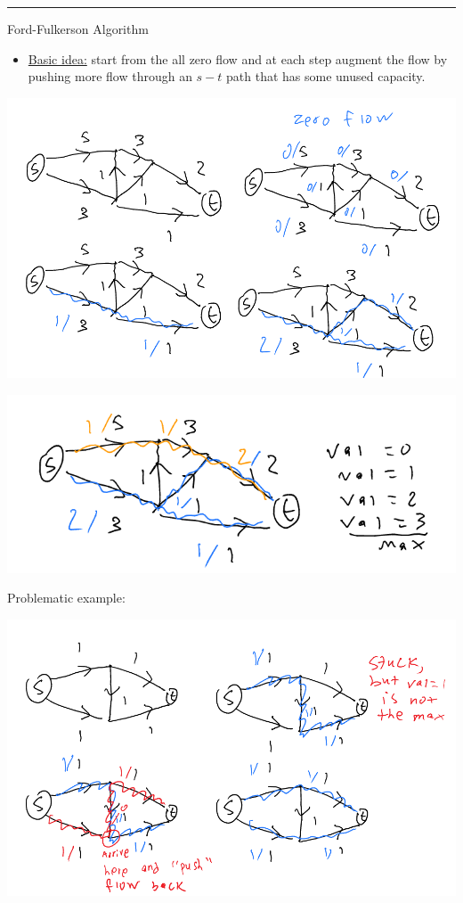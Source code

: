 \documentclass[11pt]{article}
\begin{document}
\noindent\rule{\textwidth}{0.5pt}
Ford-Fulkerson Algorithm
\begin{itemize}
\item \uline{Basic idea:} start from the all zero flow and at each step augment the flow by pushing more flow through an \(s-t\) path that has some unused capacity.
\end{itemize}
\begin{center}
\includegraphics[width=.9\linewidth]{./Images/i107.png}
\end{center}
\begin{center}
\includegraphics[width=.9\linewidth]{./Images/i108.png}
\end{center}
Problematic example:
\begin{center}
\includegraphics[width=.9\linewidth]{./Images/i109.png}
\end{center}
\end{document}
